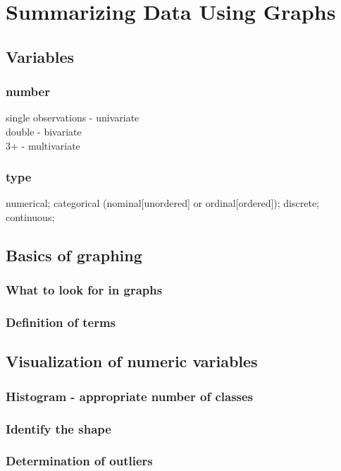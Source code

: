 \chapter{Summarizing Data Using Graphs}  %

\section{Variables}  %
\subsection{number}  %
single observations - univariate \\
double - bivariate \\
3+ - multivariate
\subsection{type}  %
numerical; categorical (nominal[unordered] or ordinal[ordered]); discrete; continuous; 

\section{Basics of graphing}  %
\subsection{What to look for in graphs}  %
\subsection{Definition of terms}  %


\section{Visualization of numeric variables}  %
\subsection{Histogram - appropriate number of classes}  %
\subsection{Identify the shape}  %
\subsection{Determination of outliers}  %